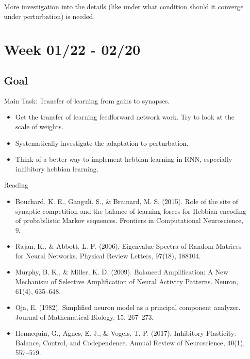 \documentclass[12pt, a4paper]{article}
\begin{document}
More investigation into the details (like under what condition should it converge under perturbation) is needed.

\newpage


\section*{Week 01/22 - 02/20}

\subsection*{Goal}

\noindent
Main Task: Transfer of learning from gains to synapses.

\begin{itemize}
    \item Get the transfer of learning feedforward network work. Try to look at the scale of weights.
    \item Systematically investigate the adaptation to perturbation.
    \item Think of a better way to implement hebbian learning in RNN, especially inhibitory hebbian learning.
\end{itemize}

\noindent
Reading

\begin{itemize}
    \item Bouchard, K. E., Ganguli, S., \& Brainard, M. S. (2015). Role of the site of synaptic competition and the balance of learning forces for Hebbian encoding of probabilistic Markov sequences. Frontiers in Computational Neuroscience, 9.
    \item Rajan, K., \& Abbott, L. F. (2006). Eigenvalue Spectra of Random Matrices for Neural Networks. Physical Review Letters, 97(18), 188104.
    \item Murphy, B. K., \& Miller, K. D. (2009). Balanced Amplification: A New Mechanism of Selective Amplification of Neural Activity Patterns. Neuron, 61(4), 635–648.
    \item Oja, E. (1982). Simplified neuron model as a principal component analyzer. Journal of Mathematical Biology, 15, 267--273.
    \item Hennequin, G., Agnes, E. J., \& Vogels, T. P. (2017). Inhibitory Plasticity: Balance, Control, and Codependence. Annual Review of Neuroscience, 40(1), 557–579.
\end{itemize}
\end{document}
